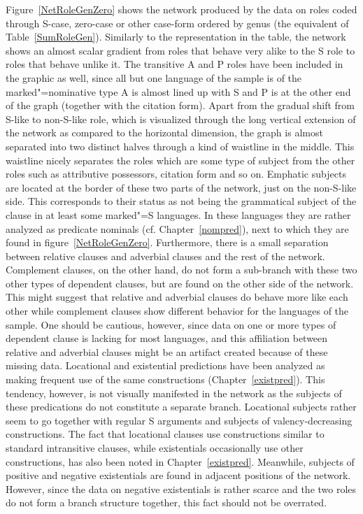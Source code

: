 Figure~\ref{NetRoleGenZero} shows the network produced by the data on roles coded through S-case, zero-case or other case-form ordered by genus (the equivalent of Table~\ref{SumRoleGen}). 
Similarly to the representation in the table, the network shows an almost scalar gradient from roles that behave very alike to the S role to roles that behave unlike it.
The transitive A and P roles have been included in the graphic as well, since all but one language of the sample is of the marked"=nominative type A is almost lined up with S and P is at the other end of the graph (together with the citation form). 
Apart from the gradual shift from S-like to non-S-like role, which is visualized through the long vertical extension of the network as compared to the horizontal dimension, the graph is almost separated into two distinct halves through a kind of waistline in the middle. 
This waistline nicely separates the roles which are some type of subject from the other roles such as attributive possessors, citation form and so on. 
Emphatic subjects are located at the border of these two parts of the network, just on the non-S-like side. 
This corresponds to their status as not being the grammatical subject of the clause in at least some marked"=S languages. 
In these languages they are rather analyzed as predicate nominals (cf. Chapter~\ref{nompred}), next to which they are found in figure~\ref{NetRoleGenZero}. 
Furthermore, there is a small separation between relative clauses and adverbial clauses and the rest of the network. 
Complement clauses, on the other hand, do not form a sub-branch with these two other types of dependent clauses, but are found on the other side of the network. 
This might suggest that relative and adverbial clauses do behave more like each other while complement clauses show different behavior for the languages of the sample. 
One should be cautious, however, since data on one or more types of dependent clause is lacking for most languages, and this affiliation between relative and adverbial clauses might be an artifact created because of these missing data.
Locational and existential predictions have been analyzed as making frequent use of the same constructions (Chapter~\ref{existpred}). 
This tendency, however, is not visually manifested in the network as the subjects of these predications do not constitute a separate branch. 
Locational subjects rather seem to go together with regular S arguments and subjects of valency-decreasing constructions. 
The fact that locational clauses use constructions similar to standard intransitive clauses, while existentials occasionally use other constructions, has also been noted in Chapter~\ref{existpred}. 
Meanwhile, subjects of positive and negative existentials are found in adjacent positions of the network. 
However, since the data on negative existentials is rather scarce and the two roles do not form a branch structure together, this fact should not be overrated. 

